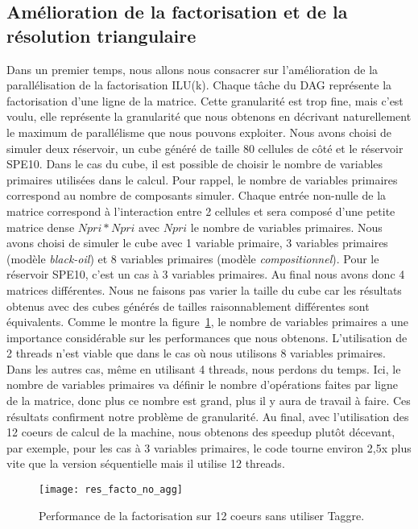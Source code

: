 \subsection{Amélioration de la factorisation et de la résolution triangulaire}
Dans un premier temps, nous allons nous consacrer sur l'amélioration de la parallélisation de la factorisation ILU(k).
%
Chaque tâche du DAG représente la factorisation d'une ligne de la matrice.
%
Cette granularité est trop fine, mais c'est voulu, elle représente la granularité que nous obtenons en décrivant naturellement le maximum  de parallélisme que nous pouvons exploiter.
%
Nous avons choisi de simuler deux réservoir, un cube généré de taille 80 cellules de côté et le réservoir SPE10.
%
Dans le cas du cube, il est possible de choisir le nombre de variables primaires utilisées dans le calcul.
%
Pour rappel, le nombre de variables primaires correspond au nombre de composants simuler.
%
Chaque entrée non-nulle de la matrice correspond à l'interaction entre 2 cellules et sera composé d'une petite matrice dense $Npri*Npri$ avec $Npri$ le nombre de variables primaires.
%
Nous avons choisi de simuler le cube avec 1 variable primaire, 3 variables primaires (modèle {\em black-oil}) et 8 variables primaires (modèle {\em compositionnel}).
%
Pour le réservoir SPE10, c'est un cas à 3 variables primaires.
%
Au final nous avons donc 4 matrices différentes.
%
Nous ne faisons pas varier la taille du cube car les résultats obtenus avec des cubes générés de tailles raisonnablement différentes sont équivalents.
%
Comme le montre la figure~\ref{fig:res_facto_no_agg}, le nombre de variables primaires a une importance considérable sur les performances que nous obtenons.
%
L'utilisation de 2 threads n'est viable que dans le cas où nous utilisons 8 variables primaires.
%
Dans les autres cas, même en utilisant 4 threads, nous perdons du temps.
%
Ici, le nombre de variables primaires va définir le nombre d'opérations faites par ligne de la matrice, donc plus ce nombre est grand, plus il y aura de travail à faire.
%
Ces résultats confirment notre problème de granularité.
%
Au final, avec l'utilisation des 12 coeurs de calcul de la machine, nous obtenons des speedup plutôt décevant, par exemple, pour les cas à 3 variables primaires, le code tourne environ 2,5x plus vite que la version séquentielle mais il utilise 12 threads.


\begin{figure}[t!]
  \centering
  \texttt{[image: res\_facto\_no\_agg]}
  \caption{Performance de la factorisation sur 12 coeurs sans utiliser Taggre.}
  \label{fig:res_facto_no_agg}
\end{figure}

